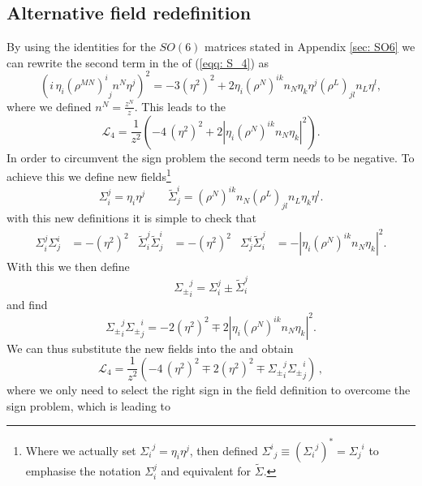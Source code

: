\subsection{Alternative field redefinition}
By using the identities for the $SO(6)$ matrices stated in Appendix \ref{sec: SO6} we can rewrite the second term in the  of (\ref{eqq: S_4}) as
%
%
\begin{equation}
\left(i\, \eta_i {(\rho^{MN})^i}_j n^N \eta^j\right)^2=-3 (\eta^2)^2+2\eta_i (\rho^N)^{ik} n_N \eta_k \eta^j (\rho^L)_{jl} n_L \eta^l,
\end{equation}
%
%
where we defined $n^{N}=\tfrac{z^{N}}{z}$. This leads to the 
%
%
\begin{equation}
\mathcal{L}_4=\frac{1}{z^2}\left(- 4\, (\eta^2)^2+2\left|\eta_i (\rho^N)^{ik} n_N \eta_k\right|^2\right).
\end{equation}
%
%
In order to circumvent the sign problem the second term needs to be negative. To achieve this we define new fields\footnote{Where we actually set ${\Sigma_i}^j=\eta_i \eta^j$, then defined ${\Sigma^{i}}_{j}\equiv({\Sigma_i}^{j})^{*}={\Sigma_{j}}^{i}$ to emphasise the notation $\Sigma_i^j$ and equivalent for $\tilde{\Sigma}$.}
%
%
\begin{equation}
\Sigma_i^j=\eta_i \eta^j \qquad \tilde{\Sigma}_j^i=(\rho^N)^{ik}n_N (\rho^L)_{jl}n_L \eta_k \eta^l.
\end{equation}
%
%
with this new definitions it is simple to check that
%
%
\begin{align}
 \Sigma^j_{i}\Sigma^i_j&=-(\eta^2)^2 & \tilde\Sigma^j_{i} \tilde\Sigma^i_j&=-(\eta^2)^2 & \Sigma^i_j \tilde\Sigma^j_i&=-\left|\eta_i (\rho^N)^{ik} n_N \eta_k\right|^2.
\end{align}
%
%
With this we then define
%
%
\begin{equation}
{\Sigma_{\pm}}_i^j=\Sigma_i^j\pm \tilde \Sigma_i^j
\end{equation}
%
%
and find
%
%
\begin{equation}
 {\Sigma_{\pm}}_i^j{\Sigma_{\pm}}_j^i=-2(\eta^2)^2 \mp 2\left|\eta_i (\rho^N)^{ik} n_N \eta_k\right|^2.
\end{equation}
%
%
We can thus substitute the new fields into the  and obtain
%
%
\begin{equation}
\mathcal{L}_4=\frac{1}{z^2}\left(- 4\, (\eta^2)^2 \mp 2(\eta^2)^2 \mp {\Sigma_{\pm}}_i^j{\Sigma_{\pm}}_j^i \right)\,,
\end{equation}
%
%
where we only need to select the right sign in the field definition to overcome the sign problem, which is leading to

